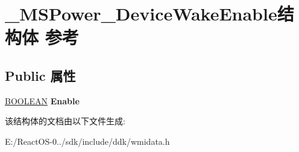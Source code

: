 \hypertarget{struct___m_s_power___device_wake_enable}{}\section{\+\_\+\+M\+S\+Power\+\_\+\+Device\+Wake\+Enable结构体 参考}
\label{struct___m_s_power___device_wake_enable}
\subsection*{Public 属性}
\begin{DoxyCompactItemize}
\item 
\mbox{\label{struct___m_s_power___device_wake_enable_a0fd828644efad32976a16257d346f901}} 
\hyperlink{_processor_bind_8h_a112e3146cb38b6ee95e64d85842e380a}{B\+O\+O\+L\+E\+AN} {\bfseries Enable}
\end{DoxyCompactItemize}


该结构体的文档由以下文件生成\+:\begin{DoxyCompactItemize}
\item 
E\+:/\+React\+O\+S-\/0../sdk/include/ddk/wmidata.\+h\end{DoxyCompactItemize}
